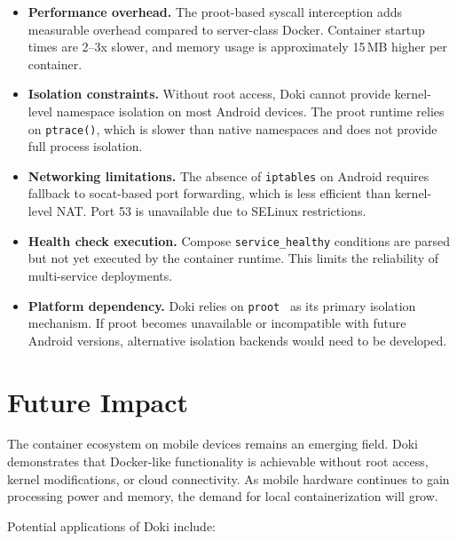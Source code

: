 \begin{itemize}[leftmargin=*, itemsep=4pt]
  \item \textbf{Performance overhead.} The proot-based syscall
        interception adds measurable overhead compared to
        server-class Docker. Container startup times are 2--3x slower,
        and memory usage is approximately 15\,MB higher per container.

  \item \textbf{Isolation constraints.} Without root access, Doki
        cannot provide kernel-level namespace isolation on most Android
        devices. The proot runtime relies on \texttt{ptrace()}, which
        is slower than native namespaces and does not provide full
        process isolation.

  \item \textbf{Networking limitations.} The absence of
        \texttt{iptables} on Android requires fallback to socat-based
        port forwarding, which is less efficient than kernel-level NAT.
        Port 53 is unavailable due to SELinux restrictions.

  \item \textbf{Health check execution.} Compose
        \texttt{service\_healthy} conditions are parsed but not yet
        executed by the container runtime. This limits the
        reliability of multi-service deployments.

  \item \textbf{Platform dependency.} Doki relies on
        \texttt{proot}~\cite{proot2024} as its primary isolation
        mechanism. If proot becomes unavailable or incompatible with
        future Android versions, alternative isolation backends would
        need to be developed.
\end{itemize}

\section{Future Impact}
\label{sec:future-impact}

The container ecosystem on mobile devices remains an emerging field.
Doki demonstrates that Docker-like functionality is achievable without
root access, kernel modifications, or cloud connectivity. As mobile
hardware continues to gain processing power and memory, the demand
for local containerization will grow.

Potential applications of Doki include:

